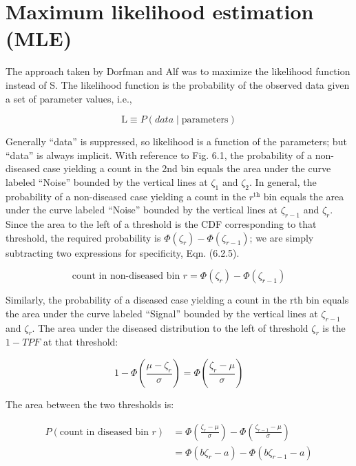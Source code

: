 \documentclass[
]{book}
\begin{document}
\hypertarget{maximum-likelihood-estimation-mle}{%
\section{Maximum likelihood estimation (MLE)}\label{maximum-likelihood-estimation-mle}}

The approach taken by Dorfman and Alf was to maximize the likelihood function instead of S. The likelihood function is the probability of the observed data given a set of parameter values, i.e.,

\begin{equation*} 
\text {L} \equiv P\left ( data \mid \text {parameters} \right )
\end{equation*}

Generally ``data'' is suppressed, so likelihood is a function of the parameters; but ``data'' is always implicit. With reference to Fig. 6.1, the probability of a non-diseased case yielding a count in the 2nd bin equals the area under the curve labeled ``Noise'' bounded by the vertical lines at \(\zeta_1\) and \(\zeta_2\). In general, the probability of a non-diseased case yielding a count in the \(r^\text{th}\) bin equals the area under the curve labeled ``Noise'' bounded by the vertical lines at \(\zeta_{r-1}\) and \(\zeta_r\). Since the area to the left of a threshold is the CDF corresponding to that threshold, the required probability is \(\Phi\left ( \zeta_r \right ) - \Phi\left ( \zeta_{r-1} \right )\); we are simply subtracting two expressions for specificity, Eqn. (6.2.5).

\begin{equation*} 
\text {count in non-diseased bin } r = \Phi\left ( \zeta_r \right ) - \Phi\left ( \zeta_{r-1} \right )
\end{equation*}

Similarly, the probability of a diseased case yielding a count in the rth bin equals the area under the curve labeled ``Signal'' bounded by the vertical lines at \(\zeta_{r-1}\) and \(\zeta_r\). The area under the diseased distribution to the left of threshold \(\zeta_r\) is the \(1 - TPF\) at that threshold:

\begin{equation*} 
1 - \Phi\left ( \frac{\mu-\zeta_r}{\sigma} \right ) = \Phi\left ( \frac{\zeta_r - \mu}{\sigma} \right )
\end{equation*}

The area between the two thresholds is:

\begin{align*} 
P\left ( \text{count in diseased bin }r \right ) &= \Phi\left ( \frac{\zeta_r - \mu}{\sigma} \right ) - \Phi\left ( \frac{\zeta_{r-1} - \mu}{\sigma} \right ) \\
&= \Phi\left ( b\zeta_r-a \right ) - \Phi\left ( b\zeta_{r-1}-a \right )
\end{align*}
\end{document}
